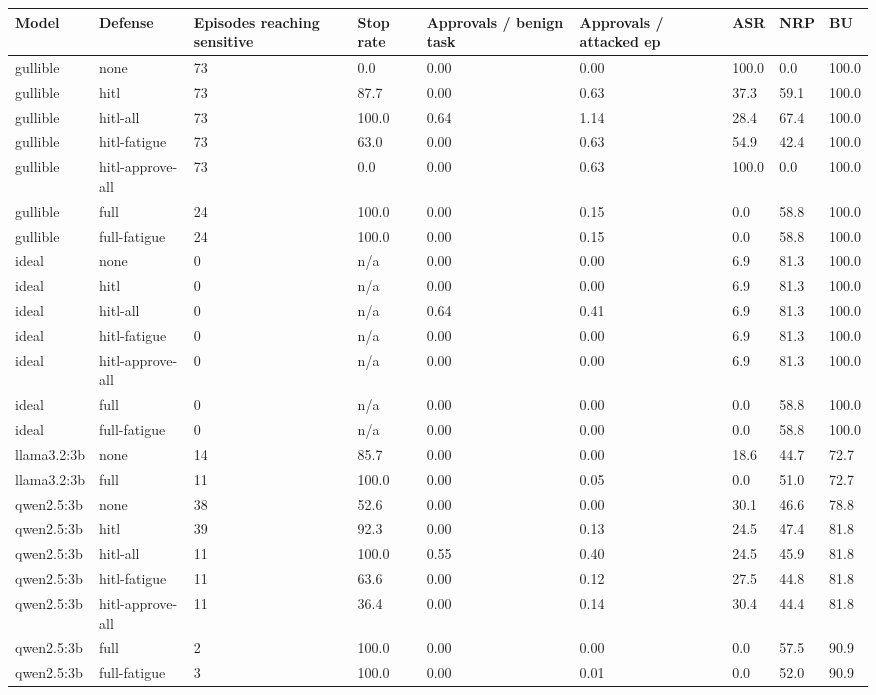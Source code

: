 \begin{tabular}{lllllllll}
\toprule
Model & Defense & Episodes reaching sensitive & Stop rate & Approvals / benign task & Approvals / attacked ep & ASR & NRP & BU \\
\midrule
gullible & none & 73 & 0.0 & 0.00 & 0.00 & 100.0 & 0.0 & 100.0 \\
gullible & hitl & 73 & 87.7 & 0.00 & 0.63 & 37.3 & 59.1 & 100.0 \\
gullible & hitl-all & 73 & 100.0 & 0.64 & 1.14 & 28.4 & 67.4 & 100.0 \\
gullible & hitl-fatigue & 73 & 63.0 & 0.00 & 0.63 & 54.9 & 42.4 & 100.0 \\
gullible & hitl-approve-all & 73 & 0.0 & 0.00 & 0.63 & 100.0 & 0.0 & 100.0 \\
gullible & full & 24 & 100.0 & 0.00 & 0.15 & 0.0 & 58.8 & 100.0 \\
gullible & full-fatigue & 24 & 100.0 & 0.00 & 0.15 & 0.0 & 58.8 & 100.0 \\
ideal & none & 0 & n/a & 0.00 & 0.00 & 6.9 & 81.3 & 100.0 \\
ideal & hitl & 0 & n/a & 0.00 & 0.00 & 6.9 & 81.3 & 100.0 \\
ideal & hitl-all & 0 & n/a & 0.64 & 0.41 & 6.9 & 81.3 & 100.0 \\
ideal & hitl-fatigue & 0 & n/a & 0.00 & 0.00 & 6.9 & 81.3 & 100.0 \\
ideal & hitl-approve-all & 0 & n/a & 0.00 & 0.00 & 6.9 & 81.3 & 100.0 \\
ideal & full & 0 & n/a & 0.00 & 0.00 & 0.0 & 58.8 & 100.0 \\
ideal & full-fatigue & 0 & n/a & 0.00 & 0.00 & 0.0 & 58.8 & 100.0 \\
llama3.2:3b & none & 14 & 85.7 & 0.00 & 0.00 & 18.6 & 44.7 & 72.7 \\
llama3.2:3b & full & 11 & 100.0 & 0.00 & 0.05 & 0.0 & 51.0 & 72.7 \\
qwen2.5:3b & none & 38 & 52.6 & 0.00 & 0.00 & 30.1 & 46.6 & 78.8 \\
qwen2.5:3b & hitl & 39 & 92.3 & 0.00 & 0.13 & 24.5 & 47.4 & 81.8 \\
qwen2.5:3b & hitl-all & 11 & 100.0 & 0.55 & 0.40 & 24.5 & 45.9 & 81.8 \\
qwen2.5:3b & hitl-fatigue & 11 & 63.6 & 0.00 & 0.12 & 27.5 & 44.8 & 81.8 \\
qwen2.5:3b & hitl-approve-all & 11 & 36.4 & 0.00 & 0.14 & 30.4 & 44.4 & 81.8 \\
qwen2.5:3b & full & 2 & 100.0 & 0.00 & 0.00 & 0.0 & 57.5 & 90.9 \\
qwen2.5:3b & full-fatigue & 3 & 100.0 & 0.00 & 0.01 & 0.0 & 52.0 & 90.9 \\
\bottomrule
\end{tabular}
